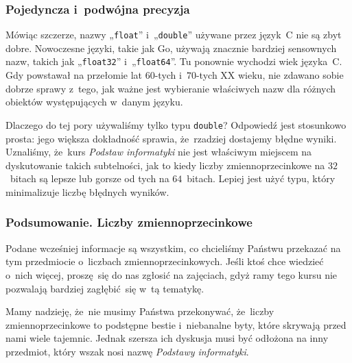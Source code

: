 \documentclass[10pt,t]{beamer}
\begin{document}
\begin{frame}
  \frametitle{Pojedyncza i~podwójna precyzja}


  Mówiąc szczerze, nazwy „\texttt{float}” i~„\texttt{double}” używane przez
  język~C nie są zbyt dobre. Nowoczesne języki, takie jak Go, używają
  znacznie bardziej sensownych nazw, takich jak „\texttt{float32}”
  i~„\texttt{float64}”. Tu ponownie wychodzi wiek języka~C. Gdy powstawał
  na przełomie lat $60$-tych i~$70$-tych XX wieku, nie zdawano sobie dobrze
  sprawy z~tego, jak ważne jest wybieranie właściwych nazw dla różnych
  obiektów występujących w~danym języku.

  Dlaczego do tej pory używaliśmy tylko typu \texttt{double}? Odpowiedź jest
  stosunkowo prosta: jego większa dokładność sprawia, że~rzadziej dostajemy
  błędne wyniki. Uznaliśmy, że~kurs \textit{Podstaw informatyki} nie jest
  właściwym miejscem na dyskutowanie takich subtelności, jak to kiedy
  liczby zmiennoprzecinkowe na $32$~bitach są lepsze lub gorsze od tych
  na $64$~bitach. Lepiej jest użyć typu, który minimalizuje liczbę błędnych
  wyników.

\end{frame}





\begin{frame}
  \frametitle{Podsumowanie. Liczby zmiennoprzecinkowe}


  Podane wcześniej informacje są wszystkim, co chcieliśmy Państwu przekazać
  na tym przedmiocie o~liczbach zmiennoprzecinkowych. Jeśli ktoś chce
  wiedzieć o~nich więcej, proszę~się do nas zgłosić na zajęciach, gdyż
  ramy tego kursu nie pozwalają bardziej zagłębić~się w~tą tematykę.

  Mamy nadzieję, że~nie musimy Państwa przekonywać, że~liczby
  zmiennoprzecinkowe to podstępne bestie i~niebanalne byty, które
  skrywają przed nami wiele tajemnic. Jednak szersza ich dyskusja musi
  być odłożona na inny przedmiot, który wszak nosi nazwę
  \textit{Podstawy informatyki}.

\end{frame}




































\printbibliography





\end{document}
